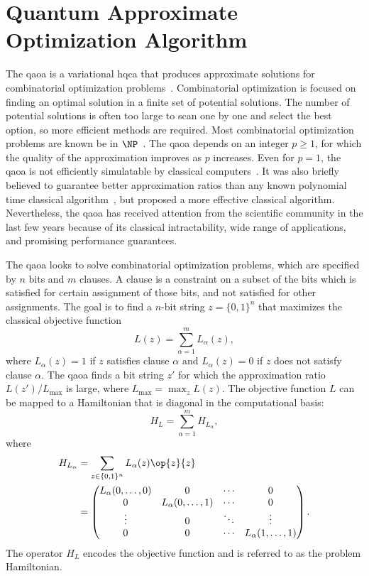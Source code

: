 \section{Quantum Approximate Optimization Algorithm} \label{sec:qaoa}
The \gls{qaoa} is a variational \gls{hqca} that produces approximate solutions for combinatorial optimization problems~\cite{farhi2014quantum}.
Combinatorial optimization is focused on finding an optimal solution in a finite set of potential solutions.
The number of potential solutions is often too large to scan one by one and select the best option, so more efficient methods are required.
Most combinatorial optimization problems are known be in $\NP$~\cite{schrijver2003combinatorial}.
The \gls{qaoa} depends on an integer $p \ge 1$, for which the quality of the approximation improves as $p$ increases.
Even for $p = 1$, the \gls{qaoa} is not efficiently simulatable by classical computers~\cite{farhi2016quantum}.
It was also briefly believed to guarantee better approximation ratios than any known polynomial time classical algorithm~\cite{farhi2014quantum}, but \textcite{barak2015beating} proposed a more effective classical algorithm.
Nevertheless, the \gls{qaoa} has received attention from the scientific community in the last few years because of its classical intractability, wide range of applications, and promising performance guarantees.

The \gls{qaoa} looks to solve combinatorial optimization problems, which are specified by $n$ bits and $m$ clauses.
A clause is a constraint on a subset of the bits which is satisfied for certain assignment of those bits, and not satisfied for other assignments.
The goal is to find a $n$-bit string $z = \{0,1\}^n$ that maximizes the classical objective function
\begin{equation} \label{eqn:objective-function}
L(z) = \sum_{\alpha=1}^m L_\alpha(z),
\end{equation}
where $L_\alpha(z) = 1$ if $z$ satisfies clause $\alpha$ and $L_\alpha(z) = 0$ if $z$ does not satisfy clause $\alpha$.
The \gls{qaoa} finds a bit string $z'$ for which the approximation ratio $L(z')/L_{\text{max}}$ is large, where $L_{\text{max}} = \max_z L(z)$.
The objective function $L$ can be mapped to a Hamiltonian that is diagonal in the computational basis:
\begin{equation}
H_L = \sum_{\alpha=1}^m H_{L_\alpha},
\end{equation}
where
\begin{align}
H_{L_\alpha} &= \sum_{z \in \{0, 1\}^n} L_\alpha(z) \op{z}{z} \\
&=
\begin{pmatrix}
L_\alpha(0,\ldots,0) & 0 & \cdots & 0 \\
0 & L_\alpha(0,\ldots,1) & \cdots & 0 \\
\vdots & 0 & \ddots & \vdots \\
0 & 0 & \cdots & L_\alpha(1,\ldots,1)
\end{pmatrix}.
\end{align}
The operator $H_L$ encodes the objective function and is referred to as the problem Hamiltonian.

